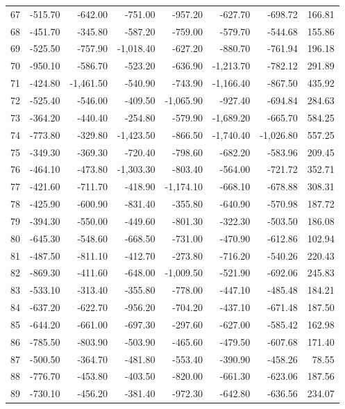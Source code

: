 \begin{longtable}{rrrrrrrr}
67 & -515.70 & -642.00 & -751.00 & -957.20 & -627.70 & -698.72 & 166.81  \\
68 & -451.70 & -345.80 & -587.20 & -759.00 & -579.70 & -544.68 & 155.86  \\
69 & -525.50 & -757.90 & -1,018.40 & -627.20 & -880.70 & -761.94 & 196.18  \\
70 & -950.10 & -586.70 & -523.20 & -636.90 & -1,213.70 & -782.12 & 291.89  \\
71 & -424.80 & -1,461.50 & -540.90 & -743.90 & -1,166.40 & -867.50 & 435.92  \\
72 & -525.40 & -546.00 & -409.50 & -1,065.90 & -927.40 & -694.84 & 284.63  \\
73 & -364.20 & -440.40 & -254.80 & -579.90 & -1,689.20 & -665.70 & 584.25  \\
74 & -773.80 & -329.80 & -1,423.50 & -866.50 & -1,740.40 & -1,026.80 & 557.25  \\
75 & -349.30 & -369.30 & -720.40 & -798.60 & -682.20 & -583.96 & 209.45  \\
76 & -464.10 & -473.80 & -1,303.30 & -803.40 & -564.00 & -721.72 & 352.71  \\
77 & -421.60 & -711.70 & -418.90 & -1,174.10 & -668.10 & -678.88 & 308.31  \\
78 & -425.90 & -600.90 & -831.40 & -355.80 & -640.90 & -570.98 & 187.72  \\
79 & -394.30 & -550.00 & -449.60 & -801.30 & -322.30 & -503.50 & 186.08  \\
80 & -645.30 & -548.60 & -668.50 & -731.00 & -470.90 & -612.86 & 102.94  \\
81 & -487.50 & -811.10 & -412.70 & -273.80 & -716.20 & -540.26 & 220.43  \\
82 & -869.30 & -411.60 & -648.00 & -1,009.50 & -521.90 & -692.06 & 245.83  \\
83 & -533.10 & -313.40 & -355.80 & -778.00 & -447.10 & -485.48 & 184.21  \\
84 & -637.20 & -622.70 & -956.20 & -704.20 & -437.10 & -671.48 & 187.50  \\
85 & -644.20 & -661.00 & -697.30 & -297.60 & -627.00 & -585.42 & 162.98  \\
86 & -785.50 & -803.90 & -503.90 & -465.60 & -479.50 & -607.68 & 171.40  \\
87 & -500.50 & -364.70 & -481.80 & -553.40 & -390.90 & -458.26 & 78.55  \\
88 & -776.70 & -453.80 & -403.50 & -820.00 & -661.30 & -623.06 & 187.56  \\
89 & -730.10 & -456.20 & -381.40 & -972.30 & -642.80 & -636.56 & 234.07  \\

\end{longtable}
